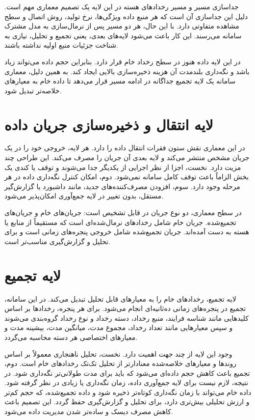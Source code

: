 جداسازی مسیر  و مسیر رخدادهای هسته در این لایه یک تصمیم معماری مهم است. دلیل این جداسازی آن است که هر منبع داده ویژگی‌ها، نرخ تولید، روش اتصال و سطح مشاهده متفاوتی دارد. با این حال، هر دو مسیر پس از نرمال‌سازی به مدل مشترک سامانه می‌رسند. این کار باعث می‌شود لایه‌های بعدی، یعنی تجمیع و تحلیل، نیازی به شناخت جزئیات منبع اولیه نداشته باشند.

در این لایه داده هنوز در سطح رخداد خام قرار دارد. بنابراین حجم داده می‌تواند زیاد باشد و نگه‌داری بلندمدت آن هزینه ذخیره‌سازی بالایی ایجاد کند. به همین دلیل، معماری سامانه یک لایه تجمیع جداگانه در ادامه مسیر قرار می‌دهد تا داده خام به معیارهای خلاصه‌تر تبدیل شود.

\section{لایه انتقال و ذخیره‌سازی جریان داده}
 در این معماری نقش ستون فقرات انتقال داده را دارد. هر لایه، خروجی خود را در یک جریان مشخص منتشر می‌کند و لایه بعدی آن جریان را مصرف می‌کند. این طراحی چند مزیت دارد. نخست، اجزا از نظر اجرایی از یکدیگر جدا می‌شوند و توقف یا کندی یک بخش الزاماً باعث توقف کامل سامانه نمی‌شود. دوم، امکان کنترل نگه‌داری داده در هر مرحله وجود دارد. سوم، افزودن مصرف‌کننده‌های جدید، مانند داشبورد یا گزارش‌گیر مستقل، بدون تغییر در لایه جمع‌آوری امکان‌پذیر می‌شود.

در سطح معماری، دو نوع جریان در  قابل تشخیص است: جریان‌های خام و جریان‌های تجمیع‌شده. جریان خام شامل رخدادهای نرمال‌شده‌ای است که مستقیماً از منابع  یا هسته به دست آمده‌اند. جریان تجمیع‌شده شامل خروجی پنجره‌های زمانی است و برای تحلیل و گزارش‌گیری مناسب‌تر است.

\section{لایه تجمیع}
لایه تجمیع، رخدادهای خام را به معیارهای قابل تحلیل تبدیل می‌کند. در این سامانه، تجمیع در پنجره‌های زمانی ده‌ثانیه‌ای انجام می‌شود. برای هر پنجره، رخدادها بر اساس کلیدهایی مانند شناسه فرایند، منبع رخداد، دسته رخداد و نوع رخداد گروه‌بندی می‌شوند و سپس معیارهایی مانند تعداد رخداد، مجموع مدت، میانگین مدت، بیشینه مدت و معیارهای اختصاصی هر دسته محاسبه می‌گردد.

وجود این لایه از چند جهت اهمیت دارد. نخست، تحلیل ناهنجاری معمولاً بر اساس روندها و معیارهای خلاصه‌شده معنادارتر از تحلیل تک‌تک رخدادهای خام است. دوم، تجمیع باعث کاهش حجم داده‌ای می‌شود که باید برای مدت طولانی‌تر نگه‌داری شود. در نتیجه، لازم نیست برای لایه جمع‌آوری داده، زمان نگه‌داری یا  زیادی در نظر گرفته شود. داده خام می‌تواند با زمان نگه‌داری کوتاه‌تر ذخیره شود و داده تجمیع‌شده، که حجم کم‌تر و ارزش تحلیلی بیش‌تری دارد، برای تحلیل و گزارش‌گیری حفظ گردد. این تصمیم باعث کاهش مصرف دیسک و ساده‌تر شدن مدیریت داده می‌شود.

